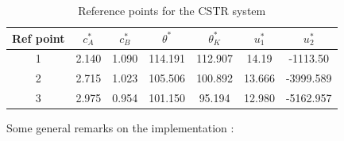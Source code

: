 \documentclass[12pt]{article}
\begin{document}
\begin{table}%
	\centering
	\begin{tabular}{|c|c|c|c|c|c|c|}
		\hline
		Ref point & $c_A^*$ & $c_B^*$ & $\theta^*$ & $\theta_K^*$ & $u_1^*$ & $u_2^*$ \\
		\hline
		1 & 2.140 & 1.090 & 114.191 & 112.907 & 14.19 & -1113.50 \\
		\hline
		2 & 2.715 & 1.023 & 105.506 & 100.892 & 13.666 & -3999.589 \\
		\hline
		3 & 2.975 &  0.954 & 101.150 & 95.194 & 12.980 & -5162.957 \\
		\hline
	\end{tabular}
	\caption{Reference points for the CSTR system}
	\label{tab:CSTR-ref-points}
\end{table}

\noindent Some general remarks on the implementation :
\end{document}
